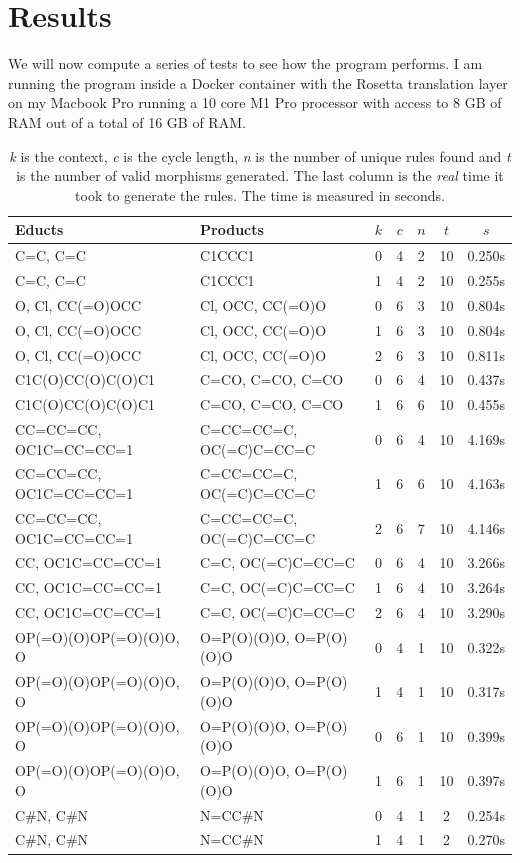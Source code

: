 \documentclass{article}
\begin{document}
\section{Results}
We will now compute a series of tests to see how the program performs. I am running the program inside a Docker container with the Rosetta translation layer on my Macbook Pro running a 10 core M1 Pro processor with access to 8 GB of RAM out of a total of 16 GB of RAM.
\begin{table}[h]
    \centering
    \begin{tabular}{ll|ccccc}\\
        Educts & Products & $k$ & $c$ & $n$ & $t$ & $s$\\\hline
        C=C, C=C & C1CCC1 & 0 & 4 & 2 & 10 & 0.250s \\
        C=C, C=C & C1CCC1 & 1 & 4 & 2 & 10 & 0.255s \\
        O, Cl, CC(=O)OCC & Cl, OCC, CC(=O)O & 0 & 6 & 3 & 10 & 0.804s \\
        O, Cl, CC(=O)OCC & Cl, OCC, CC(=O)O & 1 & 6 & 3 & 10 & 0.804s \\
        O, Cl, CC(=O)OCC & Cl, OCC, CC(=O)O & 2 & 6 & 3 & 10 & 0.811s \\
        C1C(O)CC(O)C(O)C1 & C=CO, C=CO, C=CO  & 0 & 6 & 4 & 10 & 0.437s \\
        C1C(O)CC(O)C(O)C1 & C=CO, C=CO, C=CO  & 1 & 6 & 6 & 10 & 0.455s \\
        CC=CC=CC, OC1C=CC=CC=1 & C=CC=CC=C, OC(=C)C=CC=C & 0 & 6 & 4 & 10 & 4.169s \\
        CC=CC=CC, OC1C=CC=CC=1 & C=CC=CC=C, OC(=C)C=CC=C & 1 & 6 & 6 & 10 & 4.163s \\
        CC=CC=CC, OC1C=CC=CC=1 & C=CC=CC=C, OC(=C)C=CC=C & 2 & 6 & 7 & 10 & 4.146s \\
        CC, OC1C=CC=CC=1 & C=C, OC(=C)C=CC=C & 0 & 6 & 4 & 10 & 3.266s \\
        CC, OC1C=CC=CC=1 & C=C, OC(=C)C=CC=C & 1 & 6 & 4 & 10 & 3.264s \\
        CC, OC1C=CC=CC=1 & C=C, OC(=C)C=CC=C & 2 & 6 & 4 & 10 & 3.290s \\
        OP(=O)(O)OP(=O)(O)O, O & O=P(O)(O)O, O=P(O)(O)O  & 0 & 4 & 1 & 10 & 0.322s \\
        OP(=O)(O)OP(=O)(O)O, O & O=P(O)(O)O, O=P(O)(O)O  & 1 & 4 & 1 & 10 & 0.317s \\
        OP(=O)(O)OP(=O)(O)O, O & O=P(O)(O)O, O=P(O)(O)O  & 0 & 6 & 1 & 10 & 0.399s \\
        OP(=O)(O)OP(=O)(O)O, O & O=P(O)(O)O, O=P(O)(O)O  & 1 & 6 & 1 & 10 & 0.397s \\
        C\#N, C\#N & N=CC\#N & 0 & 4 & 1 & 2 & 0.254s \\
        C\#N, C\#N & N=CC\#N & 1 & 4 & 1 & 2 & 0.270s \\
    \end{tabular}
    \caption{
        \textit{k} is the context, \textit{c} is the cycle length, \textit{n} is the number of unique rules found and \textit{t} is  the number of valid morphisms generated. The last column is the \textit{real} time it took to generate the rules. The time is measured in seconds.
    }
    
\end{table}
\newpage
\end{document}
